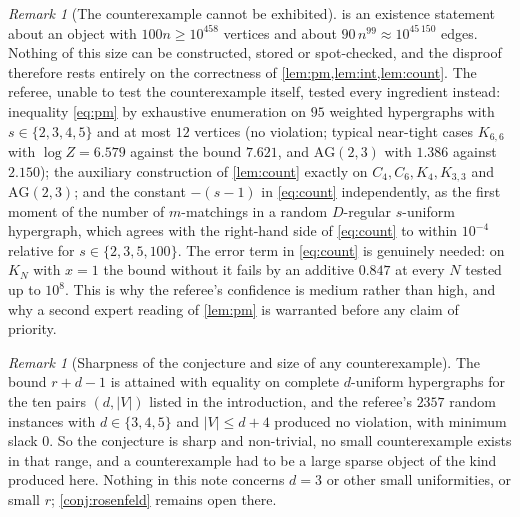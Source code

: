 \documentclass[11pt,a4paper]{article}
\theoremstyle{plain}
\theoremstyle{definition}
\theoremstyle{remark}
\newtheorem{remark}[theorem]{Remark}
\begin{document}
\begin{remark}[The counterexample cannot be exhibited]\label{rem:size}
 is an existence statement about an object with $100n\ge10^{458}$ vertices and about $90\,n^{99}\approx10^{45\,150}$ edges. Nothing of this size can be constructed, stored or spot-checked, and the disproof therefore rests entirely on the correctness of \cref{lem:pm,lem:int,lem:count}. The referee, unable to test the counterexample itself, tested every ingredient instead: inequality \eqref{eq:pm} by exhaustive enumeration on $95$ weighted hypergraphs with $s\in\{2,3,4,5\}$ and at most $12$ vertices (no violation; typical near-tight cases $K_{6,6}$ with $\log Z=6.579$ against the bound $7.621$, and $\mathrm{AG}(2,3)$ with $1.386$ against $2.150$); the auxiliary construction of \cref{lem:count} exactly on $C_4,C_6,K_4,K_{3,3}$ and $\mathrm{AG}(2,3)$; and the constant $-(s-1)$ in \eqref{eq:count} independently, as the first moment of the number of $m$-matchings in a random $D$-regular $s$-uniform hypergraph, which agrees with the right-hand side of \eqref{eq:count} to within $10^{-4}$ relative for $s\in\{2,3,5,100\}$. The error term in \eqref{eq:count} is genuinely needed: on $K_N$ with $x=1$ the bound without it fails by an additive $0.847$ at every $N$ tested up to $10^8$. This is why the referee's confidence is medium rather than high, and why a second expert reading of \cref{lem:pm} is warranted before any claim of priority.
\end{remark}

\begin{remark}[Sharpness of the conjecture and size of any counterexample]\label{rem:sharp}
The bound $r+d-1$ is attained with equality on complete $d$-uniform hypergraphs for the ten pairs $(d,|V|)$ listed in the introduction, and the referee's $2357$ random instances with $d\in\{3,4,5\}$ and $|V|\le d+4$ produced no violation, with minimum slack $0$. So the conjecture is sharp and non-trivial, no small counterexample exists in that range, and a counterexample had to be a large sparse object of the kind produced here. Nothing in this note concerns $d=3$ or other small uniformities, or small $r$; \cref{conj:rosenfeld} remains open there.
\end{remark}
\end{document}
